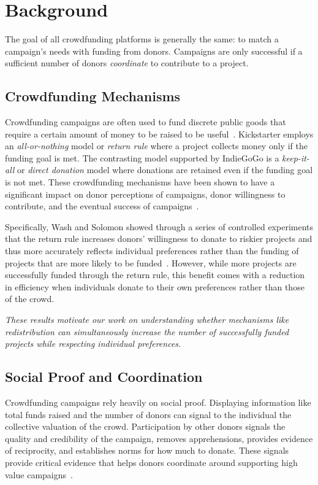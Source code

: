\section{Background}
\label{sec:background}

The goal of all crowdfunding platforms is generally the same: to match a campaign's needs with funding from donors. Campaigns are only successful if a sufficient number of donors \textit{coordinate} to contribute to a project. 

\subsection{Crowdfunding Mechanisms}

Crowdfunding campaigns are often used to fund discrete public goods that require a certain amount of money to be raised to be useful~\cite{belleflamme, greenberg2012crowdfunding, wash-returnrule}. Kickstarter employs an \textit{all-or-nothing} model or \textit{return rule} where a project collects money only if the funding goal is met. The contrasting model supported by IndieGoGo is a \textit{keep-it-all} or \textit{direct donation} model where donations are retained even if the funding goal is not met. These crowdfunding mechanisms have been shown to have a significant impact on donor perceptions of campaigns, donor willingness to contribute, and the eventual success of campaigns~\cite{cumming2014crowdfunding, wash-returnrule}.

Specifically, Wash and Solomon showed through a series of controlled experiments that the return rule increases donors' willingness to donate to riskier projects and thus more accurately reflects individual preferences rather than the funding of projects that are more likely to be funded~\cite{wash-returnrule}. However, while more projects are successfully funded through the return rule, this benefit comes with a reduction in efficiency 
when individuals donate to their own preferences rather than those of the crowd.

\textit{These results motivate our work on understanding whether mechanisms like redistribution can simultaneously increase the number of successfully funded projects while respecting individual preferences.}

\subsection{Social Proof and Coordination}

Crowdfunding campaigns rely heavily on social proof. Displaying information like total funds raised and the number of donors can signal to the individual the collective valuation of the crowd. Participation by other donors signals the quality and credibility of the campaign, removes apprehensions, provides evidence of reciprocity, and establishes norms for how much to donate. These signals provide critical evidence that helps donors coordinate around supporting high value campaigns~\cite{mollick2014dynamics, cotterill2011impacts}.

